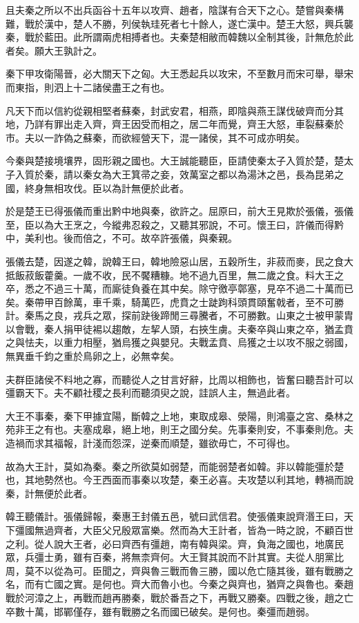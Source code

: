 且夫秦之所以不出兵函谷十五年以攻齊、趙者，陰謀有合天下之心。楚嘗與秦構難，戰於漢中，楚人不勝，列侯執珪死者七十餘人，遂亡漢中。楚王大怒，興兵襲秦，戰於藍田。此所謂兩虎相搏者也。夫秦楚相敝而韓魏以全制其後，計無危於此者矣。願大王孰計之。

秦下甲攻衛陽晉，必大關天下之匈。大王悉起兵以攻宋，不至數月而宋可舉，舉宋而東指，則泗上十二諸侯盡王之有也。

凡天下而以信約從親相堅者蘇秦，封武安君，相燕，即陰與燕王謀伐破齊而分其地，乃詳有罪出走入齊，齊王因受而相之，居二年而覺，齊王大怒，車裂蘇秦於市。夫以一詐偽之蘇秦，而欲經營天下，混一諸侯，其不可成亦明矣。

今秦與楚接境壤界，固形親之國也。大王誠能聽臣，臣請使秦太子入質於楚，楚太子入質於秦，請以秦女為大王箕帚之妾，效萬室之都以為湯沐之邑，長為昆弟之國，終身無相攻伐。臣以為計無便於此者。

於是楚王已得張儀而重出黔中地與秦，欲許之。屈原曰，前大王見欺於張儀，張儀至，臣以為大王烹之，今縱弗忍殺之，又聽其邪說，不可。懷王曰，許儀而得黔中，美利也。後而倍之，不可。故卒許張儀，與秦親。

張儀去楚，因遂之韓，說韓王曰，韓地險惡山居，五穀所生，非菽而麥，民之食大抵飯菽飯藿羹。一歲不收，民不饜糟糠。地不過九百里，無二歲之食。料大王之卒，悉之不過三十萬，而廝徒負養在其中矣。除守徼亭鄣塞，見卒不過二十萬而已矣。秦帶甲百餘萬，車千乘，騎萬匹，虎賁之士跿跔科頭貫頤奮戟者，至不可勝計。秦馬之良，戎兵之眾，探前趹後蹄閒三尋騰者，不可勝數。山東之士被甲蒙胄以會戰，秦人捐甲徒裼以趨敵，左挈人頭，右挾生虜。夫秦卒與山東之卒，猶孟賁之與怯夫，以重力相壓，猶烏獲之與嬰兒。夫戰孟賁、烏獲之士以攻不服之弱國，無異垂千鈞之重於鳥卵之上，必無幸矣。

夫群臣諸侯不料地之寡，而聽從人之甘言好辭，比周以相飾也，皆奮曰聽吾計可以彊霸天下。夫不顧社稷之長利而聽須臾之說，詿誤人主，無過此者。

大王不事秦，秦下甲據宜陽，斷韓之上地，東取成皋、滎陽，則鴻臺之宮、桑林之苑非王之有也。夫塞成皋，絕上地，則王之國分矣。先事秦則安，不事秦則危。夫造禍而求其福報，計淺而怨深，逆秦而順楚，雖欲毋亡，不可得也。

故為大王計，莫如為秦。秦之所欲莫如弱楚，而能弱楚者如韓。非以韓能彊於楚也，其地勢然也。今王西面而事秦以攻楚，秦王必喜。夫攻楚以利其地，轉禍而說秦，計無便於此者。

韓王聽儀計。張儀歸報，秦惠王封儀五邑，號曰武信君。使張儀東說齊湣王曰，天下彊國無過齊者，大臣父兄殷眾富樂。然而為大王計者，皆為一時之說，不顧百世之利。從人說大王者，必曰齊西有彊趙，南有韓與梁。齊，負海之國也，地廣民眾，兵彊士勇，雖有百秦，將無柰齊何。大王賢其說而不計其實。夫從人朋黨比周，莫不以從為可。臣聞之，齊與魯三戰而魯三勝，國以危亡隨其後，雖有戰勝之名，而有亡國之實。是何也。齊大而魯小也。今秦之與齊也，猶齊之與魯也。秦趙戰於河漳之上，再戰而趙再勝秦，戰於番吾之下，再戰又勝秦。四戰之後，趙之亡卒數十萬，邯鄲僅存，雖有戰勝之名而國已破矣。是何也。秦彊而趙弱。

